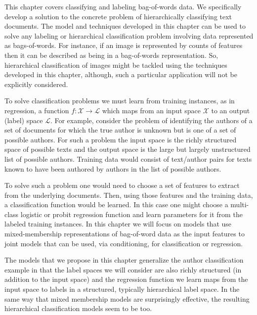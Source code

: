 This chapter covers classifying and labeling bag-of-words data.  %
We specifically develop a solution to the concrete problem of hierarchically classifying text documents.  The model and techniques developed in this chapter can be used to solve any labeling or hierarchical classification problem involving data represented as bags-of-words.  For instance,  if an image is represented by counts of features then it can be described as being in a bag-of-words representation.   So, hierarchical classification of images might be tackled using the techniques developed in this chapter, although, such a particular application will not be explicitly considered.

To solve classification problems we must learn from training instances, as in regression, a function $f : \mathcal{X} \rightarrow \mathcal{L}$ which maps from an input space $\mathcal{X}$ to an output (label) space $\mathcal{L}$.   For example, consider the problem of identifying the authors of a set of documents for which the true author is unknown but is one of a set of possible authors.   For such a problem the input space is the richly structured space of possible texts and the output space is the large but largely unstructured list of possible authors.  Training data would consist of text/author pairs for texts known to have been authored by authors in the list of possible authors.

To solve such a problem one would need to choose a set of features to extract from the underlying documents. Then, using those features and the training data, a classification function would be learned.  In this case one might choose a multi-class logistic or probit regression function and learn parameters for it from the labeled training instances.   In this chapter we will focus on models that use mixed-membership representations of bag-of-word data as the input features to joint models that can be used, via conditioning, for classification or regression.

The models that we propose in this chapter generalize the author classification example in that the label spaces we will consider are also richly structured (in addition to the input space) and the regression function we learn maps from the input space to labels in a structured, typically hierarchical label space.  In the same way that mixed membership models are surprisingly effective, the resulting hierarchical classification models seem to be too.

